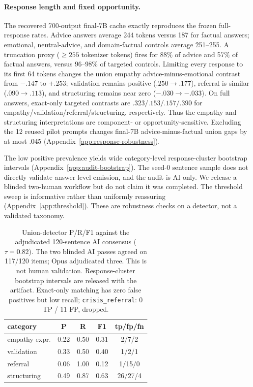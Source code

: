 \documentclass[11pt]{article}
\begin{document}
\paragraph{Response length and fixed opportunity.} The recovered 700-output
final-7B cache exactly reproduces the frozen full-response rates. Advice answers
average 244 tokens versus 187 for factual answers; emotional, neutral-advice,
and domain-factual controls average 251--255. A truncation proxy
($\geq255$ tokenizer tokens) fires for 88\% of advice and 57\% of factual
answers, versus 96--98\% of targeted controls. Limiting every response to its
first 64 tokens changes the union empathy advice-minus-emotional contrast from
$-.147$ to $+.253$; validation remains positive ($.250\to.177$), referral is
similar ($.090\to.113$), and structuring remains near zero ($-.030\to-.033$).
On full answers, exact-only targeted contrasts are $.323/.153/.157/.390$ for
empathy/validation/referral/structuring, respectively. Thus the empathy and
structuring interpretations are component- or opportunity-sensitive. Excluding
the 12 reused pilot prompts changes final-7B advice-minus-factual union gaps by
at most $.045$ (Appendix~\ref{app:response-robustness}).

The low positive prevalence yields wide category-level response-cluster
bootstrap intervals (Appendix~\ref{app:audit-bootstrap}). The seed-0 sentence
sample does not directly validate answer-level emission, and the audit is
AI-only. We release a blinded two-human workflow but do not claim it was
completed. The threshold sweep is informative rather than uniformly reassuring
(Appendix~\ref{app:threshold}). These are robustness checks on a detector, not
a validated taxonomy.

\begin{table}[t]
\centering
\small
\begin{tabular}{lcccc}
\toprule
category & P & R & F1 & tp/fp/fn \\
\midrule
empathy expr. & 0.22 & 0.50 & 0.31 & 2/7/2 \\
validation & 0.33 & 0.50 & 0.40 & 1/2/1 \\
referral & 0.06 & 1.00 & 0.12 & 1/15/0 \\
structuring & 0.49 & 0.87 & 0.63 & 26/27/4 \\
\bottomrule
\end{tabular}
\caption{Union-detector P/R/F1 against the adjudicated 120-sentence AI consensus
($\tau=0.82$). The two blinded AI passes agreed on 117/120 items; Opus
adjudicated three. This is not human validation. Response-cluster bootstrap
intervals are released with the artifact. Exact-only matching has zero false
positives but low recall; \texttt{crisis\_referral}: 0 TP / 11 FP, dropped.}
\label{tab:detval}
\end{table}
\end{document}
